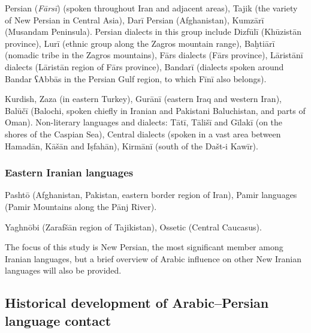 \documentclass[output=paper]{langsci/langscibook}
\begin{document}
Persian (\textit{Fārsī}) (spoken throughout Iran and adjacent areas), Tajik (the variety of New Persian in Central Asia), Darī Persian (Afghanistan), Kumzārī (Musandam Peninsula). Persian dialects in this group include Dizfūlī (Khūzistān province), Lurī (ethnic group along the Zagros mountain range), Baḫtiārī (nomadic tribe in the Zagros mountains), Fārs dialects (Fārs province), Lāristānī dialects (Lāristān region of Fārs province), Bandarī (dialects spoken around Bandar ʕAbbās in the Persian Gulf region, to which Fīnī also belongs).



Kurdish, Zaza (in eastern Turkey), Gurānī (eastern Iraq and western Iran), Balūčī (Balochi, spoken chiefly in Iranian and Pakistani Baluchistan, and parts of Oman). Non-literary languages and dialects: Tātī, Tālišī and Gīlakī (on the shores of the Caspian Sea), Central dialects (spoken in a vast area between Hamadān, Kāšān and Iṣfahān), Kirmānī (south of the Dašt-i Kawīr).



\subsubsection{Eastern Iranian languages}

Pashtō (Afghanistan, Pakistan, eastern border region of Iran), Pamir languages (Pamir Mountains along the Pānj River).

Yaghnōbi (Zarafšān region of Tajikistan), Ossetic (Central Caucasus).

The focus of this study is New Persian, the most significant member among Iranian languages, but a brief overview of Arabic influence on other New Iranian languages will also be provided.

\subsection{Historical development of Arabic–Persian language contact} %
\end{document}
